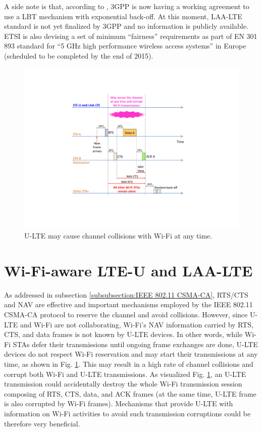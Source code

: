 A side note is that, according to \cite{U-LTE-FCC-Cisco-2015}, 3GPP is now having a working agreement to use a LBT mechanism with exponential back-off. At this moment, LAA-LTE standard is not yet finalized by 3GPP and no information is publicly available. ETSI is also devising a set of minimum ``fairness'' requirements as part of EN 301 893 standard for ``5 GHz high performance wireless access systems'' in Europe (scheduled to be completed by the end of 2015).
\begin{figure}[!t]
	\centering
	\includegraphics[width=0.7\columnwidth]{figures2/LTE-U-enhancement-RTS-CTS-NAV}
	\caption{U-LTE may cause channel collisions with Wi-Fi at any time.}
	\label{figs:LTE-U-enhancement-RTS-CTS-NAV}
\end{figure}

\section{Wi-Fi-aware LTE-U and LAA-LTE}
\label{subsection:Wi-Fi-aware}

As addressed in subsection \ref{subsubsection:IEEE 802.11 CSMA-CA}, RTS/CTS and NAV are effective and important mechanisms employed by the IEEE 802.11 CSMA-CA protocol to reserve the channel and avoid collisions. However, since U-LTE and Wi-Fi are not collaborating, Wi-Fi's NAV information carried by RTS, CTS, and data frames is not known by U-LTE devices. In other words, while Wi-Fi STAs defer their transmissions until ongoing frame exchanges are done, U-LTE devices do not respect Wi-Fi reservation and may start their transmissions at any time, as shown in Fig. \ref{figs:LTE-U-enhancement-RTS-CTS-NAV}. This may result in a high rate of channel collisions and corrupt both Wi-Fi and U-LTE transmissions. As visualized Fig. \ref{figs:LTE-U-enhancement-RTS-CTS-NAV}, an U-LTE transmission could accidentally destroy the whole Wi-Fi transmission session composing of RTS, CTS, data, and ACK frames (at the same time, U-LTE frame is also corrupted by Wi-Fi frames). Mechanisms that provide U-LTE with information on Wi-Fi activities to avoid such transmission corruptions could be therefore very beneficial.

